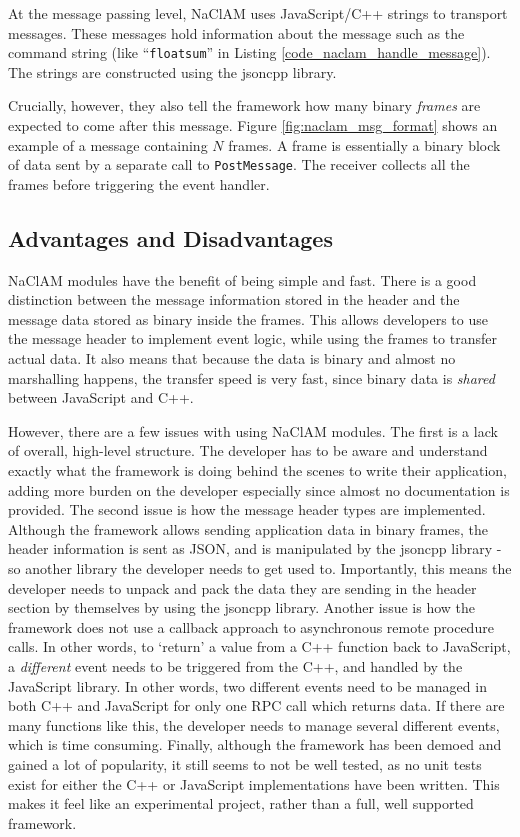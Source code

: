 At the message passing level, NaClAM uses JavaScript/C++ strings to transport messages. These messages hold information about the message such as the command string (like ``\lstinline{floatsum}'' in Listing \ref{code_naclam_handle_message}). The strings are constructed using the jsoncpp library. 

Crucially, however, they also tell the framework how many binary \emph{frames} are expected to come after this message. Figure \ref{fig:naclam_msg_format} shows an example of a message containing $N$ frames. A frame is essentially a binary block of data sent by a separate call to \lstinline{PostMessage}. The receiver collects all the frames before triggering the event handler.


\subsection{Advantages and Disadvantages} %
\label{sub:naclam_advantages_and_disadvantages}
NaClAM modules have the benefit of being simple and fast. There is a good distinction between the message information stored in the header and the message data stored as binary inside the frames. This allows developers to use the message header to implement event logic, while using the frames to transfer actual data. It also means that because the data is binary and almost no marshalling happens, the transfer speed is very fast, since binary data is \emph{shared} between JavaScript and C++.

However, there are a few issues with using NaClAM modules. The first is a lack of overall, high-level structure. The developer has to be aware and understand exactly what the framework is doing behind the scenes to write their application, adding more burden on the developer especially since almost no documentation is provided. The second issue is how the message header types are implemented. Although the framework allows sending application data in binary frames, the header information is sent as JSON, and is manipulated by the jsoncpp library - so another library the developer needs to get used to. Importantly, this means the developer needs to unpack and pack the data they are sending in the header section by themselves by using the jsoncpp library. Another issue is how the framework does not use a callback approach to asynchronous remote procedure calls. In other words, to `return' a value from a C++ function back to JavaScript, a \emph{different} event needs to be triggered from the C++, and handled by the JavaScript library. In other words, two different events need to be managed in both C++ and JavaScript for only one RPC call which returns data. If there are many functions like this, the developer needs to manage several different events, which is time consuming. Finally, although the framework has been demoed and gained a lot of popularity, it still seems to not be well tested, as no unit tests exist for either the C++ or JavaScript implementations have been written. This makes it feel like an experimental project, rather than a full, well supported framework. 

